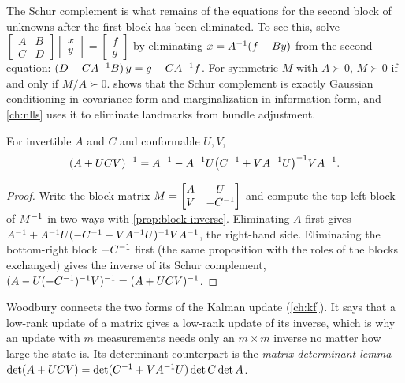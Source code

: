The Schur complement is what remains of the equations for the second block of unknowns after the first block has been eliminated. To see
this, solve $\begin{bmatrix}A & B\\C & D\end{bmatrix}\begin{bmatrix}x\\y\end{bmatrix} = \begin{bmatrix}f\\g\end{bmatrix}$ by eliminating
$x = A^{-1}(f - By)$ from the second equation: $(D - CA^{-1} B)\,y = g - CA^{-1} f$. For symmetric $M$ with $A \succ 0$, $M \succ 0$ if and only if
$M/A \succ 0$.  shows that the Schur complement is exactly Gaussian conditioning in covariance form and marginalization in
information form, and \cref{ch:nlls} uses it to eliminate landmarks from bundle adjustment.

\begin{theorem}
\label{thm:woodbury}
For invertible $A$ and $C$ and conformable $U, V$,
\begin{equation}
  (A + U C V)^{-1} = A^{-1} - A^{-1} U \big( C^{-1} + V A^{-1} U \big)^{-1} V A^{-1} .
\end{equation}
\end{theorem}
\begin{proof}
Write the block matrix $M = \begin{bmatrix} A & U \\ V & -C^{-1}\end{bmatrix}$ and compute the top-left block of $M^{-1}$ in two ways with
\cref{prop:block-inverse}. Eliminating $A$ first gives $A^{-1} + A^{-1} U(-C^{-1} - VA^{-1} U)^{-1} VA^{-1}$, the right-hand side. Eliminating the
bottom-right block $-C^{-1}$ first (the same proposition with the roles of the blocks exchanged) gives the inverse of its Schur complement,
$(A - U(-C^{-1})^{-1} V)^{-1} = (A + UCV)^{-1}$.
\end{proof}

Woodbury connects the two forms of the Kalman update (\cref{ch:kf}). It says that a low-rank update of a matrix gives a low-rank update of
its inverse, which is why an update with $m$ measurements needs only an $m\times m$ inverse no matter how large the state is. Its
determinant counterpart is the \emph{matrix determinant lemma} $\det(A + UCV) = \det(C^{-1} + VA^{-1} U)\det C\det A$.

